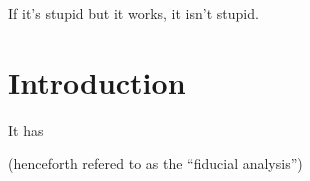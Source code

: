 \begin{savequote}[75mm]
If it's stupid but it works, it isn't stupid.
\end{savequote}

\chapter{Introduction}

It has 

\cite{supportnote} (henceforth refered to as the ``fiducial analysis'')
